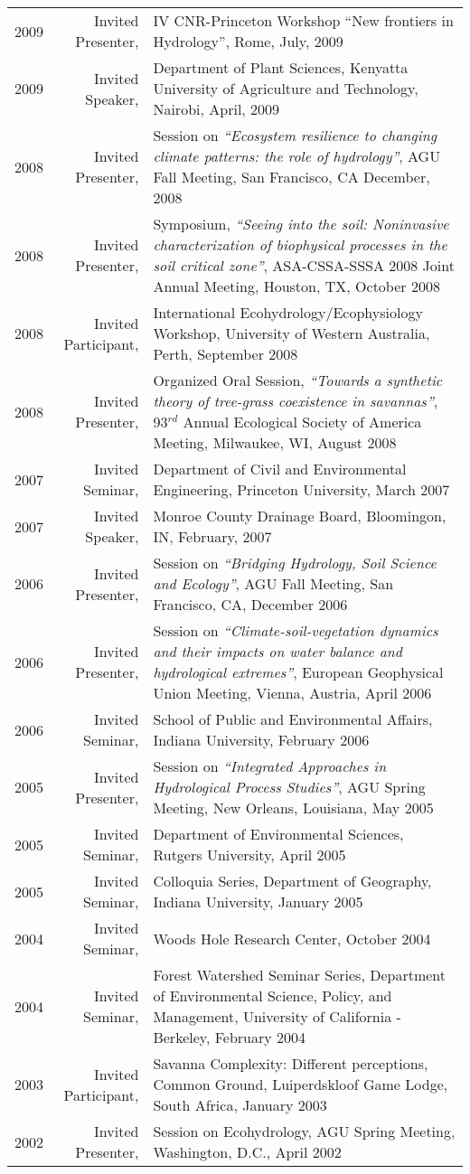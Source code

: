 \documentclass[10pt]{report}
\begin{document}
\begin{longtable}{p{.25in} r p{}}
2009 & Invited Presenter, & IV CNR-Princeton Workshop ``New frontiers in Hydrology'', Rome, July, 2009 \\
2009 & Invited Speaker, & Department of Plant Sciences, Kenyatta University of Agriculture and Technology, Nairobi, April, 2009 \\
2008 & Invited Presenter, & Session on \emph{``Ecosystem resilience to changing climate patterns: the role of hydrology''}, AGU Fall Meeting, San Francisco, CA December, 2008 \\
2008 & Invited Presenter, & Symposium, \emph{``Seeing into the soil: Noninvasive characterization of biophysical processes in the soil critical zone''}, ASA-CSSA-SSSA 2008 Joint Annual Meeting, Houston, TX, October 2008 \\
2008 & Invited Participant, &  International Ecohydrology/Ecophysiology Workshop, University of Western Australia, Perth, September 2008 \\
2008 & Invited Presenter, & Organized Oral Session, \emph{``Towards a synthetic theory of tree-grass coexistence in savannas''}, 93$^{rd}$ Annual Ecological Society of America Meeting, Milwaukee, WI, August 2008 \\
2007 & Invited Seminar, & Department of Civil and Environmental Engineering, Princeton University, March 2007 \\
2007 & Invited Speaker, & Monroe County Drainage Board, Bloomingon, IN, February, 2007 \\
2006 & Invited Presenter, & Session on \emph{``Bridging Hydrology, Soil Science and Ecology''}, AGU Fall Meeting, San Francisco, CA, December 2006 \\
2006 & Invited Presenter, & Session on \emph{``Climate-soil-vegetation dynamics and their impacts on water balance and hydrological extremes''}, European Geophysical Union Meeting, Vienna, Austria, April 2006 \\
2006 & Invited Seminar, & School of Public and Environmental Affairs, Indiana University, February 2006 \\ 
2005 & Invited Presenter, & Session on \emph{``Integrated Approaches in Hydrological Process Studies''}, AGU Spring Meeting, New Orleans, Louisiana, May 2005 \\
2005 & Invited Seminar, & Department of Environmental Sciences, Rutgers University, April 2005 \\
2005 & Invited Seminar, & Colloquia Series, Department of Geography, Indiana University, January 2005 \\
2004 & Invited Seminar, & Woods Hole Research Center, October 2004 \\
2004 & Invited Seminar, & Forest Watershed Seminar Series, Department of Environmental Science, Policy, and Management, University of California - Berkeley, February 2004 \\
2003 & Invited Participant, & Savanna Complexity: Different perceptions, Common Ground, Luiperdskloof Game Lodge, South Africa, January 2003 \\
2002 & Invited Presenter, & Session on Ecohydrology, AGU Spring Meeting, Washington, D.C., April 2002 \\
\end{longtable}
\end{document}
